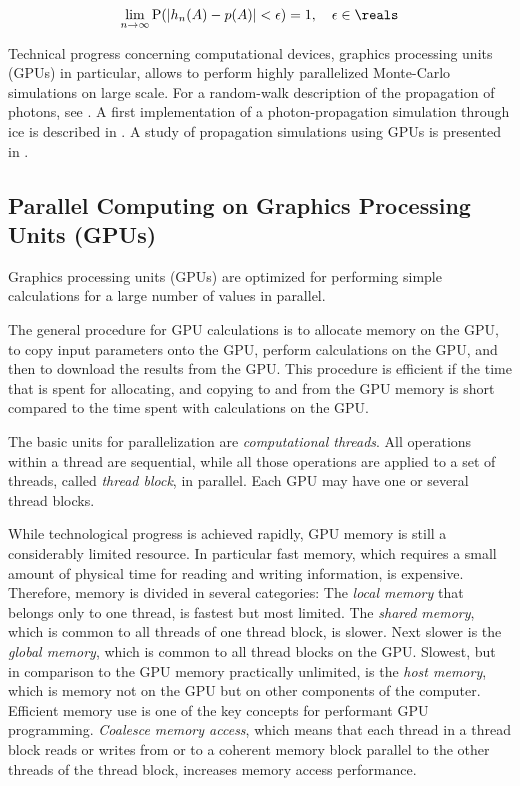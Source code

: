 $$
  \lim_{n \rightarrow \infty} \text{P}(|h_n(A) - p(A)| < \epsilon) = 1, \ \ \ \epsilon \in \reals
$$

Technical progress concerning computational devices, graphics processing units (GPUs) in particular, allows to perform highly parallelized Monte-Carlo simulations on large scale. For a random-walk description of the propagation of photons, see \cite{absorption1997}. A first implementation of a photon-propagation simulation through ice is described in \cite{lundberg}. A study of propagation simulations using GPUs is presented in \cite{ppcpaper}.


\subsection{Parallel Computing on Graphics Processing Units (GPUs)}
\label{sec:parallel_computing}

Graphics processing units (GPUs) are optimized for performing simple calculations for a large number of values in parallel.

The general procedure for GPU calculations is to allocate memory on the GPU, to copy input parameters onto the GPU, perform calculations on the GPU, and then to download the results from the GPU. This procedure is efficient if the time that is spent for allocating, and copying to and from the GPU memory is short compared to the time spent with calculations on the GPU. \cite{cudacourse}

The basic units for parallelization are \textit{computational threads}. All operations within a thread are sequential, while all those operations are applied to a set of threads, called \textit{thread block}, in parallel. Each GPU may have one or several thread blocks. \cite{cudacourse}

While technological progress is achieved rapidly, GPU memory is still a considerably limited resource. In particular fast memory, which requires a small amount of physical time for reading and writing information, is expensive. Therefore, memory is divided in several categories: The \textit{local memory} that belongs only to one thread, is fastest but most limited. The \textit{shared memory}, which is common to all threads of one thread block, is slower. Next slower is the \textit{global memory}, which is common to all thread blocks on the GPU. Slowest, but in comparison to the GPU memory practically unlimited, is the \textit{host memory}, which is memory not on the GPU but on other components of the computer. Efficient memory use is one of the key concepts for performant GPU programming.
\textit{Coalesce memory access}, which means that each thread in a thread block reads or writes from or to a coherent memory block parallel to the other threads of the thread block, increases memory access performance.
\cite{cudacourse}

